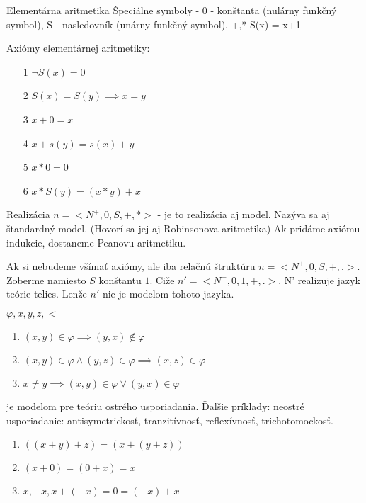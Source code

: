 \begin{priklad}{Elementárna aritmetika}
Špeciálne symboly - 0 - konštanta (nulárny funkčný symbol),
    S - nasledovník (unárny funkčný symbol),
    +,*
    S(x) = x+1

Axiómy elementárnej aritmetiky:
\begin{itemize}
    \item[1] $\neg S(x) = 0$
    \item[2] $S(x) = S(y) \implies x=y$
    \item[3] $x+0 = x$
    \item[4] $x+s(y) = s(x) + y$
    \item[5] $x * 0 = 0$
    \item[6] $x * S(y) = (x*y)+x$
\end{itemize}
Realizácia
$n=<N^+,0,S,+,*>$ - je to realizácia aj model. Nazýva sa aj štandardný
model. (Hovorí sa jej aj Robinsonova aritmetika)
Ak pridáme axiómu indukcie, dostaneme Peanovu aritmetiku.
\end{priklad}

\begin{poznamka}
    Ak si nebudeme všímať axiómy, ale iba relačnú štruktúru
    $n=<N^+,0,S,+,.>$. Zoberme namiesto $S$ konštantu $1$.
    Ciže $n'=<N^+,0,1,+,.>$. N' realizuje jazyk teórie telies.
    Lenže $n'$ nie je modelom tohoto jazyka. 
\end{poznamka}

\begin{priklad}[Usporiadania]
    $\varphi, x, y, z, <$
    \begin{enumerate}
        \item $(x,y) \in \varphi  \implies (y,x) \notin  \varphi$
        \item $(x,y) \in \varphi \land (y,z) \in \varphi \implies (x,z) \in \varphi$
        \item $x \neq y \implies (x,y) \in \varphi \lor (y,x) \in \varphi$
    \end{enumerate}

je modelom pre teóriu ostrého usporiadania.
Ďalšie príklady: neostré usporiadanie: antisymetrickosť, tranzitívnosť,
reflexívnosť, trichotomockosť.
\end{priklad}


\begin{priklad}
    \begin{enumerate}
            \item $((x+y)+z) = (x+(y+z))$
            \item $(x+0) = (0+x) = x$
            \item $x, -x, x+(-x) = 0 = (-x)+x$
    \end{enumerate}
\end{priklad}

